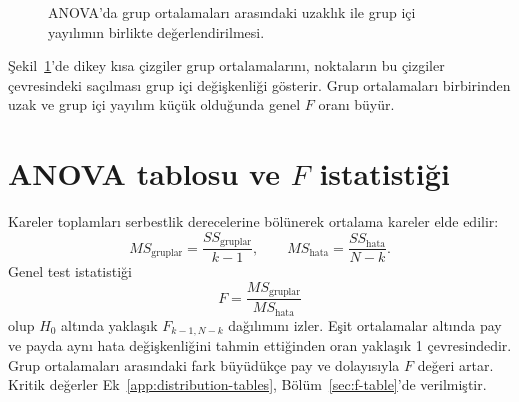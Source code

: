 \begin{figure}[H]
\centering
{}
\caption{ANOVA'da grup ortalamaları arasındaki uzaklık ile grup içi yayılımın birlikte değerlendirilmesi.}
\label{fig:anova-variation}
\end{figure}

Şekil~\ref{fig:anova-variation}'de dikey kısa çizgiler grup ortalamalarını,
noktaların bu çizgiler çevresindeki saçılması grup içi değişkenliği gösterir.
Grup ortalamaları birbirinden uzak ve grup içi yayılım küçük olduğunda genel
$F$ oranı büyür.

\section[ANOVA tablosu ve F istatistiği]{ANOVA tablosu ve $F$ istatistiği}
\label{sec:anova-table}

Kareler toplamları serbestlik derecelerine bölünerek ortalama kareler elde edilir:
\[
MS_{\text{gruplar}}=\frac{SS_{\text{gruplar}}}{k-1},
\qquad
MS_{\text{hata}}=\frac{SS_{\text{hata}}}{N-k}.
\]
Genel test istatistiği
\[
F=\frac{MS_{\text{gruplar}}}{MS_{\text{hata}}}
\]
olup $H_0$ altında yaklaşık $F_{k-1,N-k}$ dağılımını izler. Eşit ortalamalar
altında pay ve payda aynı hata değişkenliğini tahmin ettiğinden oran yaklaşık
1 çevresindedir. Grup ortalamaları arasındaki fark büyüdükçe pay ve dolayısıyla
$F$ değeri artar. Kritik değerler Ek~\ref{app:distribution-tables},
Bölüm~\ref{sec:f-table}'de verilmiştir.

